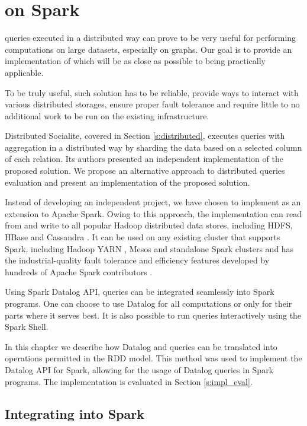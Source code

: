 

\chapter{\datalogra on Spark}\label{r:implementation}

\datalogra queries executed in a distributed way can prove to be very useful for performing computations on large datasets, especially on graphs. Our goal is to provide an implementation of \datalogra which will be as close as possible to being practically applicable.

To be truly useful, such solution has to be reliable, provide ways to interact with various distributed storages, ensure proper fault tolerance and require little to no additional work to be run on the existing infrastructure.

Distributed Socialite, covered in Section \ref{s:distributed}, executes queries with aggregation in a distributed way by sharding the data based on a selected column of each relation. Its authors presented an independent implementation of the proposed solution. We propose an alternative approach to distributed \datalogra queries evaluation and present an implementation of the proposed solution.

Instead of developing an independent project, we have chosen to implement \datalogra as an extension to Apache Spark. Owing to this approach, the implementation can read from and write to all popular Hadoop distributed data stores, including HDFS, HBase and Cassandra \cite{sparkwww}. It can be used on any existing cluster that supports Spark, including Hadoop YARN \cite{hadoop}, Mesos and standalone Spark clusters \cite{sparkwww} and has the industrial-quality fault tolerance and efficiency features developed by hundreds of Apache Spark contributors \cite{githubspark}. 

Using Spark Datalog API, \datalogra queries can be integrated seamlessly into Spark programs. One can choose to use Datalog for all computations or only for their parts where it serves best. It is also possible to run \datalogra queries interactively using the Spark Shell.

In this chapter we describe how Datalog and \datalogra queries can be translated into operations permitted in the RDD model. This method was used to implement the Datalog API for Spark, allowing for the usage of Datalog queries in Spark programs. The implementation is evaluated in Section \ref{s:impl_eval}.

\section{Integrating \datalogra into Spark}

